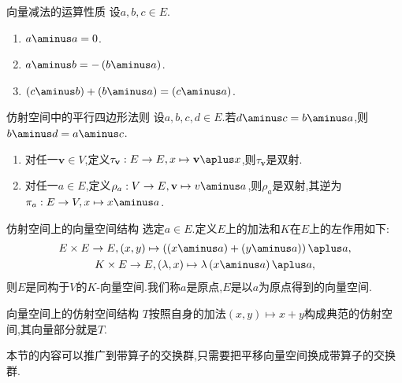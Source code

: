 \begin{proposition}{向量减法的运算性质}{}
	设$a,b,c\in E$.
	\begin{enumerate}
		\item $a\aminus a=0$.
		\item $a\aminus b=-\left(b\aminus a\right)$.
		\item $\left(c\aminus b\right)+\left(b\aminus a\right)=\left(c\aminus a\right)$.
	\end{enumerate}
\end{proposition}

\begin{proposition}{仿射空间中的平行四边形法则}{}
	设$a,b,c,d\in E$.若$d\aminus c=b\aminus a$,则$b\aminus d=a\aminus c$.
\end{proposition}

\begin{proposition}{}{}
	\begin{enumerate}
		\item 对任一$\mathbf{v}\in V$,定义$\tau_{\mathbf{v}}:E\to E,x\mapsto\mathbf{v}\aplus x$,则$\tau_{\mathbf{v}}$是双射.
		\item 对任一$a\in E$,定义$\rho_{a}:V\to E,\mathbf{v}\mapsto v\aminus a$,则$\rho_{a}$是双射,其逆为$\pi_{a}:E\to V,x\mapsto x\aminus a$.
	\end{enumerate}
\end{proposition}

\begin{proposition}{仿射空间上的向量空间结构}{}
	选定$a\in E$.定义$E$上的加法和$K$在$E$上的左作用如下:
	\begin{gather*}
		E\times E\to E,\left(x,y\right)\mapsto\left(\left(x\aminus a\right)+\left(y\aminus a\right)\right)\aplus a,\\
		K\times E\to E,\left(\lambda,x\right)\mapsto\lambda\left(x\aminus a\right)\aplus a,
	\end{gather*}
	则$E$是同构于$V$的$K$-向量空间.我们称$a$是原点,$E$是以$a$为原点得到的向量空间.
\end{proposition}

\begin{corollary}{向量空间上的仿射空间结构}{}
	$T$按照自身的加法$\left(x,y\right)\mapsto x+y$构成典范的仿射空间,其向量部分就是$T$.
\end{corollary}

\begin{remark}{}{}
	本节的内容可以推广到带算子的交换群,只需要把平移向量空间换成带算子的交换群.
\end{remark}
